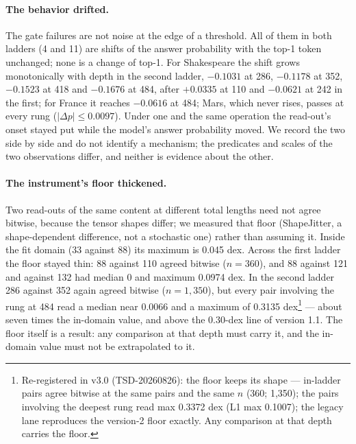 \documentclass[11pt]{article}
\begin{document}
\paragraph{The behavior drifted.} The gate failures are not noise at the edge of a threshold. All of them in both ladders (4 and 11) are shifts of the answer probability with the top-1 token unchanged; none is a change of top-1. For Shakespeare the shift grows monotonically with depth in the second ladder, $-0.1031$ at 286, $-0.1178$ at 352, $-0.1523$ at 418 and $-0.1676$ at 484, after $+0.0335$ at 110 and $-0.0621$ at 242 in the first; for France it reaches $-0.0616$ at 484; Mars, which never rises, passes at every rung ($|\Delta p| \leq 0.0097$). Under one and the same operation the read-out's onset stayed put while the model's answer probability moved. We record the two side by side and do not identify a mechanism; the predicates and scales of the two observations differ, and neither is evidence about the other.

\paragraph{The instrument's floor thickened.} Two read-outs of the same content at different total lengths need not agree bitwise, because the tensor shapes differ; we measured that floor (ShapeJitter, a shape-dependent difference, not a stochastic one) rather than assuming it. Inside the fit domain (33 against 88) its maximum is 0.045 dex. Across the first ladder the floor stayed thin: 88 against 110 agreed bitwise ($n = 360$), and 88 against 121 and against 132 had median 0 and maximum 0.0974 dex. In the second ladder 286 against 352 again agreed bitwise ($n = 1{,}350$), but every pair involving the rung at 484 read a median near 0.0066 and a maximum of 0.3135 dex\footnote{Re-registered in v3.0 (TSD-20260826): the floor keeps its shape --- in-ladder pairs agree bitwise at the same pairs and the same $n$ (360; 1{,}350); the pairs involving the deepest rung read max 0.3372 dex (L1 max 0.1007); the legacy lane reproduces the version-2 floor exactly. Any comparison at that depth carries the floor.} --- about seven times the in-domain value, and above the 0.30-dex line of version 1.1. The floor itself is a result: any comparison at that depth must carry it, and the in-domain value must not be extrapolated to it.
\end{document}
